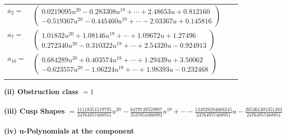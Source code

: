 \documentclass[1p]{elsarticle_modified}
\theoremstyle{definition}
\begin{document}
\begin{tabular}{m{7pt} m{180pt} m{7pt} m{180pt} }
\flushright $a_{2}=$&$\begin{pmatrix}0.0219095 u^{20}-0.283308 u^{19}+\cdots+2.48653 u+0.812160\\-0.519367 u^{20}-0.445460 u^{19}+\cdots-2.03367 u+0.145816\end{pmatrix}$ \\
\flushright $a_{7}=$&$\begin{pmatrix}1.01832 u^{20}+1.08146 u^{19}+\cdots+1.09672 u+1.27496\\0.272340 u^{20}-0.310322 u^{19}+\cdots+2.54320 u-0.924913\end{pmatrix}$ \\
\flushright $a_{10}=$&$\begin{pmatrix}0.684289 u^{20}+0.403574 u^{19}+\cdots+1.29439 u+3.50062\\-0.623557 u^{20}-1.06224 u^{19}+\cdots+1.98393 u-0.232468\end{pmatrix}$\\&\end{tabular}
\flushleft \textbf{(ii) Obstruction class $= 1$}\\~\\
\flushleft \textbf{(iii) Cusp Shapes $= \frac{11118351519795}{24764957468951} u^{20}-\frac{6479749559907}{3537851066993} u^{19}+\cdots-\frac{134928284668245}{24764957468951} u-\frac{205361301351383}{24764957468951}$}\\~\\
\newpage\renewcommand{\arraystretch}{1}
\flushleft \textbf{(iv) u-Polynomials at the component}\newline \\
\end{document}

